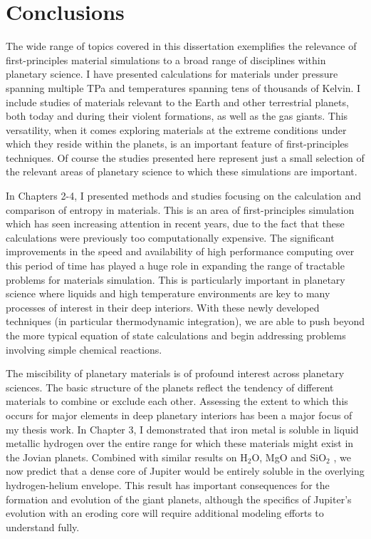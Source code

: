 \chapter{Conclusions}\label{chap9}

The wide range of topics covered in this dissertation exemplifies the relevance of
first-principles material simulations to a broad range of disciplines within
planetary science. I have presented calculations for materials under pressure
spanning multiple TPa and temperatures spanning tens of thousands of Kelvin. I
include studies of materials relevant to the Earth and other terrestrial planets,
both today and during their violent formations, as well as the gas giants. This
versatility, when it comes exploring materials at the extreme conditions under which
they reside within the planets, is an important feature of first-principles
techniques. Of course the studies presented here represent just a small selection of
the relevant areas of planetary science to which these simulations are important.

In Chapters 2-4, I presented methods and studies focusing on the calculation and
comparison of entropy in materials. This is an area of first-principles simulation
which has seen increasing attention in recent years, due to the fact that these
calculations were previously too computationally expensive. The significant
improvements in the speed and availability of high performance computing over this
period of time has played a huge role in expanding the range of tractable problems
for materials simulation. This is particularly important in planetary science where
liquids and high temperature environments are key to many processes of interest in
their deep interiors. With these newly developed techniques (in particular
thermodynamic integration), we are able to push beyond the more typical equation of
state calculations and begin addressing problems involving simple chemical reactions.

The miscibility of planetary materials is of profound interest across planetary
sciences. The basic structure of the planets reflect the tendency of different
materials to combine or exclude each other. Assessing the extent to which this occurs
for major elements in deep planetary interiors has been a major focus of my thesis
work. In Chapter 3, I demonstrated that iron metal is soluble in liquid metallic
hydrogen over the entire range for which these materials might exist in the Jovian
planets.  Combined with similar results on H$_2$O, MgO and SiO$_2$
\citep{Wilson2012a,wilson12b,Gonzalez2013}, we now predict that a dense core of Jupiter
would be entirely soluble in the overlying hydrogen-helium envelope. This result has
important consequences for the formation and evolution of the giant planets, although
the specifics of Jupiter's evolution with an eroding core will require additional
modeling efforts to understand fully. 

